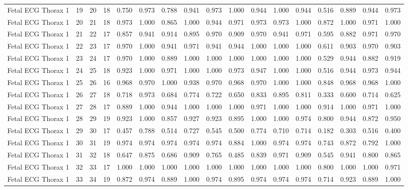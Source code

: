 \begin{longtable}{lllllllllllllllll}
Fetal ECG Thorax 1 & 19 & 20 & 18 & 0.750 & 0.973 & 0.788 & 0.941 & 0.973 & 1.000 & 0.944 & 1.000 & 0.944 & 0.516 & 0.889 & 0.944 & 0.973 \\
Fetal ECG Thorax 1 & 20 & 21 & 18 & 0.973 & 1.000 & 0.865 & 1.000 & 0.944 & 0.971 & 0.973 & 0.973 & 1.000 & 0.872 & 1.000 & 0.971 & 1.000 \\
Fetal ECG Thorax 1 & 21 & 22 & 17 & 0.857 & 0.941 & 0.914 & 0.895 & 0.970 & 0.909 & 0.970 & 0.941 & 0.971 & 0.595 & 0.882 & 0.971 & 0.970 \\
Fetal ECG Thorax 1 & 22 & 23 & 17 & 0.970 & 1.000 & 0.941 & 0.971 & 0.941 & 0.944 & 1.000 & 1.000 & 1.000 & 0.611 & 0.903 & 0.970 & 0.903 \\
Fetal ECG Thorax 1 & 23 & 24 & 17 & 0.970 & 1.000 & 0.889 & 1.000 & 1.000 & 1.000 & 1.000 & 1.000 & 1.000 & 0.529 & 0.944 & 0.882 & 0.919 \\
Fetal ECG Thorax 1 & 24 & 25 & 18 & 0.923 & 1.000 & 0.971 & 1.000 & 1.000 & 0.973 & 0.947 & 1.000 & 1.000 & 0.516 & 0.944 & 0.973 & 0.944 \\
Fetal ECG Thorax 1 & 25 & 26 & 16 & 0.968 & 0.970 & 1.000 & 0.938 & 0.970 & 0.968 & 0.970 & 1.000 & 1.000 & 0.848 & 0.968 & 0.968 & 1.000 \\
Fetal ECG Thorax 1 & 26 & 27 & 18 & 0.718 & 0.973 & 0.684 & 0.774 & 0.722 & 0.650 & 0.833 & 0.895 & 0.811 & 0.333 & 0.600 & 0.714 & 0.625 \\
Fetal ECG Thorax 1 & 27 & 28 & 17 & 0.889 & 1.000 & 0.944 & 1.000 & 1.000 & 1.000 & 0.971 & 1.000 & 1.000 & 0.914 & 1.000 & 0.971 & 1.000 \\
Fetal ECG Thorax 1 & 28 & 29 & 19 & 0.923 & 1.000 & 0.857 & 0.927 & 0.923 & 0.895 & 1.000 & 1.000 & 0.974 & 0.800 & 0.944 & 0.872 & 0.950 \\
Fetal ECG Thorax 1 & 29 & 30 & 17 & 0.457 & 0.788 & 0.514 & 0.727 & 0.545 & 0.500 & 0.774 & 0.710 & 0.714 & 0.182 & 0.303 & 0.516 & 0.400 \\
Fetal ECG Thorax 1 & 30 & 31 & 19 & 0.974 & 0.974 & 0.974 & 0.974 & 0.974 & 0.884 & 1.000 & 0.974 & 0.974 & 0.743 & 0.872 & 0.792 & 1.000 \\
Fetal ECG Thorax 1 & 31 & 32 & 18 & 0.647 & 0.875 & 0.686 & 0.909 & 0.765 & 0.485 & 0.839 & 0.971 & 0.909 & 0.545 & 0.941 & 0.800 & 0.865 \\
Fetal ECG Thorax 1 & 32 & 33 & 17 & 1.000 & 1.000 & 1.000 & 1.000 & 1.000 & 1.000 & 1.000 & 1.000 & 1.000 & 0.800 & 1.000 & 1.000 & 0.971 \\
Fetal ECG Thorax 1 & 33 & 34 & 19 & 0.872 & 0.974 & 0.889 & 1.000 & 0.974 & 0.895 & 0.974 & 0.974 & 0.974 & 0.714 & 0.923 & 0.889 & 1.000 \\

\end{longtable}
